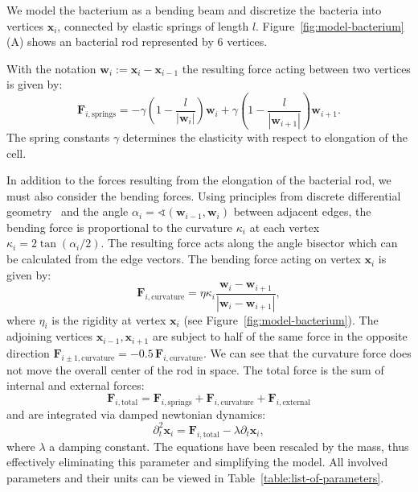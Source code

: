 \documentclass[10pt,letterpaper]{article}
\renewcommand{\vec}[1]{\mathbf{#1}}
\begin{document}
We model the bacterium as a bending beam and
discretize the bacteria into vertices $\vec{x}_i$, connected by elastic springs of length $l$.
Figure~\ref{fig:model-bacterium} (A) shows an bacterial rod represented by $6$ vertices.

With the notation $\vec{w}_i:=\vec{x}_i-\vec{x}_{i-1}$ the resulting force acting between two
vertices is given by:
\begin{equation}
    \vec{F}_{i,\text{springs}} =
        -\gamma\left(1 - \frac{l}{\left|\vec{w}_i\right|}\right) \vec{w}_i
        + \gamma\left(1 - \frac{l}{\left|\vec{w}_{i+1}\right|}\right) \vec{w}_{i+1}.
\end{equation}
The spring constants $\gamma$ determines the elasticity with respect to elongation of the cell.

In addition to the forces resulting from the elongation of the bacterial rod, we must also consider
the bending forces.
Using principles from discrete differential geometry~\cite{bobenko2008discrete, Amir2014_2} and the
angle $\alpha_i = \sphericalangle(\vec{w}_{i-1},\vec{w}_i)$ between adjacent edges, the bending
force is proportional to the curvature $\kappa_i$ at each vertex $\kappa_i = 2\tan(\alpha_i/2)$.
The resulting force acts along the angle bisector which can be calculated from the edge vectors.
The bending force acting on vertex $\vec{x}_i$ is given by:
\begin{equation}
    \vec{F}_{i,\text{curvature}} = \eta\kappa_i
        \frac{\vec{w}_i - \vec{w}_{i+1}}{|\vec{w}_i-\vec{w}_{i+1}|},
\end{equation}
where $\eta_i$ is the rigidity at vertex $\vec{x}_i$ (see Figure~\ref{fig:model-bacterium}).
The adjoining vertices $\vec{x}_{i-1},\vec{x}_{i+1}$ are subject to half of the same force in the
opposite direction $\vec{F}_{i\pm 1,\text{curvature}} = -0.5\,\vec{F}_{i,\text{curvature}}$.
We can see that the curvature force does not move the overall center of the rod in space.
The total force is the sum of internal and external forces:
\begin{equation}
    \vec{F}_{i,\text{total}} = \vec{F}_{i,\text{springs}}+ \vec{F}_{i,\text{curvature}}
        + \vec{F}_{i,\text{external}}
\end{equation}
and are integrated via damped newtonian dynamics:
\begin{equation}
    \partial_t^2 \vec{x}_i = \vec{F}_{i,\text{total}} - \lambda \partial_t\vec{x}_i,
\end{equation}
where $\lambda$ a damping constant. The equations have been rescaled by the mass, thus effectively
eliminating this parameter and simplifying the model. All involved parameters and their units can
be viewed in Table~\ref{table:list-of-parameters}.
\end{document}
